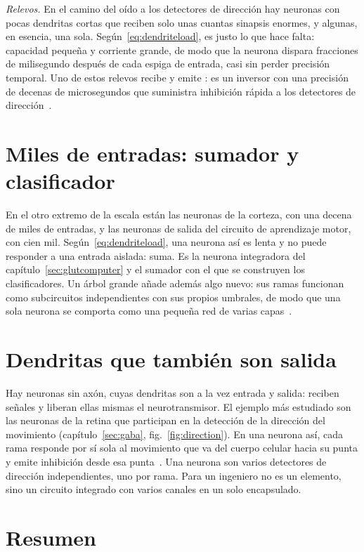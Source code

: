 \emph{Relevos.} En el camino del oído a los detectores de dirección hay neuronas con pocas dendritas cortas que reciben solo unas cuantas sinapsis enormes, y algunas, en esencia, una sola. Según~\eqref{eq:dendriteload}, es justo lo que hace falta: capacidad pequeña y corriente grande, de modo que la neurona dispara fracciones de milisegundo después de cada espiga de entrada, casi sin perder precisión temporal. Uno de estos relevos recibe  y emite : es un inversor con una precisión de decenas de microsegundos que suministra inhibición rápida a los detectores de dirección~\cite{BorstSoria2012}.

\section{Miles de entradas: sumador y clasificador}

En el otro extremo de la escala están las neuronas  de la corteza, con una decena de miles de entradas, y las neuronas  de salida del circuito de aprendizaje motor, con cien mil. Según~\eqref{eq:dendriteload}, una neurona así es lenta y no puede responder a una entrada aislada: suma. Es la neurona integradora del capítulo~\ref{sec:glutcomputer} y el sumador con el que se construyen los clasificadores. Un árbol grande añade además algo nuevo: sus ramas funcionan como subcircuitos independientes con sus propios umbrales, de modo que una sola neurona se comporta como una pequeña red de varias capas~\cite{Beniaguev2021,Gidon2020}.

\section{Dendritas que también son salida}

Hay neuronas sin axón, cuyas dendritas son a la vez entrada y salida: reciben señales y liberan ellas mismas el neurotransmisor. El ejemplo más estudiado son las neuronas  de la retina que participan en la detección de la dirección del movimiento (capítulo~\ref{sec:gaba}, fig.~\ref{fig:direction}). En una neurona así, cada rama responde por sí sola al movimiento que va del cuerpo celular hacia su punta y emite inhibición desde esa punta~\cite{Euler2002}. Una neurona son varios detectores de dirección independientes, uno por rama. Para un ingeniero no es un elemento, sino un circuito integrado con varios canales en un solo encapsulado.

\section{Resumen}

